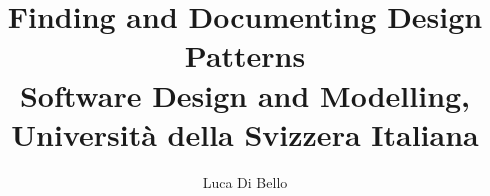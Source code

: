 \documentclass[a4paper, 11pt]{article}
\title{Finding and Documenting Design Patterns\\
\large Software Design and Modelling, Università della Svizzera Italiana}
\author{Luca Di Bello}
\date{\displaydate{today}}
\begin{document}
\maketitle





\pagebreak
\printbibliography
\end{document}
